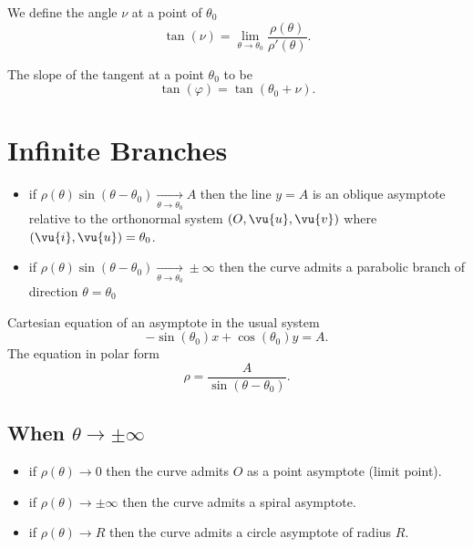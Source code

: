 We define the angle $\nu$ at a point of $\theta_0$
\[
	\tan(\nu) = \lim_{\theta \to \theta_0}\frac{\rho(\theta)}{\rho'(\theta)}
	.\]

The slope of the tangent at a point $\theta_0$ to be
\[
	\tan(\varphi) = \tan(\theta_0 + \nu)
	.\]

\section{Infinite Branches}
\begin{itemize}
	\item if $\rho(\theta)\sin(\theta-\theta_0)\underset{\theta\to\theta_0}{\longrightarrow}A$ then the line $y=A$ is an oblique asymptote relative to the orthonormal system $(O,\vu{u},\vu{v})$ where $(\vu{i},\vu{u}) = \theta_0$.
	\item if $\rho(\theta)\sin(\theta-\theta_0)\underset{\theta\to\theta_0}{\longrightarrow}\pm\infty$ then the curve admits a parabolic branch of direction $\theta=\theta_0$
\end{itemize}

Cartesian equation of an asymptote in the usual system
\[
	-\sin(\theta_0)x + \cos(\theta_0)y = A
	.\]
The equation in polar form
\[
	\rho = \frac{A}{\sin(\theta - \theta_0)}
	.\]

\subsection{When $\theta\to\pm\infty$}
\begin{itemize}
	\item if $\rho(\theta)\to 0$ then the curve admits $O$ as a point asymptote (limit point).
	\item if $\rho(\theta)\to \pm\infty$ then the curve admits a spiral asymptote.
	\item if $\rho(\theta)\to R$ then the curve admits a circle asymptote of radius $R$.
\end{itemize}
